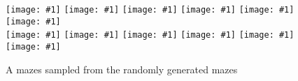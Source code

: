 \begin{figure}[t!]%
\centering%
\def\figw{0.16\columnwidth}%
\newcommand{\includesnapshot}[1]{%
  \texttt{[image: \#1]}}%
\includesnapshot{images/snapshot/00063000-snapshot.png}%
\includesnapshot{images/snapshot/00087000-snapshot.png}%
\includesnapshot{images/snapshot/00156165-snapshot.png}%
\includesnapshot{images/snapshot/00159840-snapshot.png}%
\includesnapshot{images/snapshot/00164160-snapshot.png}%
\includesnapshot{images/snapshot/00166605-snapshot.png}\\
\includesnapshot{images/snapshot/00193065-snapshot.png}%
\includesnapshot{images/snapshot/00338220-snapshot.png}%
\includesnapshot{images/snapshot/00344985-snapshot.png}%
\includesnapshot{images/snapshot/00948930-snapshot.png}%
\includesnapshot{images/snapshot/00956325-snapshot.png}%
\includesnapshot{images/snapshot/00977220-snapshot.png}%
\caption{A mazes sampled from the randomly generated mazes}%
\label{fig:environments}
\end{figure}
